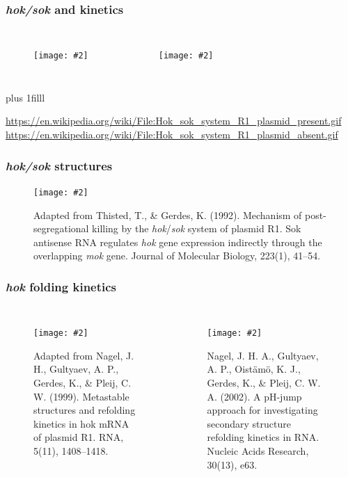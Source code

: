\documentclass{beamer}
\newcommand{\slidefigure}[2][1]{\texttt{[image: \#2]}}
\newcommand{\btVFill}{\vskip 0pt plus 1filll}
\begin{document}
\begin{frame}
  \frametitle{{\em hok/sok} and kinetics}
  \begin{columns}
  \begin{figure}
  \centering
  \slidefigure{r1present}
  \end{figure}

  \begin{figure}
  \centering
  \slidefigure{r1missing}
  \end{figure}
  \end{columns}

  \btVFill
  \begin{center}
  \tiny
  \color{litegray}
  \url{https://en.wikipedia.org/wiki/File:Hok_sok_system_R1_plasmid_present.gif} \\
  \url{https://en.wikipedia.org/wiki/File:Hok_sok_system_R1_plasmid_absent.gif}
  \end{center}
\end{frame}

\begin{frame}
  \frametitle{{\em hok/sok} structures}
  \begin{figure}
  \centering
  \slidefigure{hoksoksequence}
  \caption{Adapted from Thisted, T., \& Gerdes, K. (1992). Mechanism of post-segregational killing by the {\em hok}/{\em sok} system of plasmid R1. Sok antisense RNA regulates {\em hok} gene expression indirectly through the overlapping {\em mok} gene. Journal of Molecular Biology, 223(1), 41--54.}
  \end{figure}
\end{frame}

\begin{frame}
  \frametitle{{\em hok} folding kinetics}
  \begin{columns}
  \begin{figure}
  \centering
  \slidefigure[.7]{hoktranscription}
  \caption{\tiny Adapted from Nagel, J. H., Gultyaev, A. P., Gerdes, K., \& Pleij, C. W. (1999). Metastable structures and refolding kinetics in hok mRNA of plasmid R1. RNA, 5(11), 1408--1418.}
  \end{figure}

  \begin{figure}
  \centering
  \slidefigure{hokrefoldingkinetics}
  \caption{\tiny Nagel, J. H. A., Gultyaev, A. P., Oist{\"a}m{\"o}, K. J., Gerdes, K., \& Pleij, C. W. A. (2002). A pH-jump approach for investigating secondary structure refolding kinetics in RNA. Nucleic Acids Research, 30(13), e63.}
  \end{figure}
  \end{columns}
\end{frame}
\end{document}
